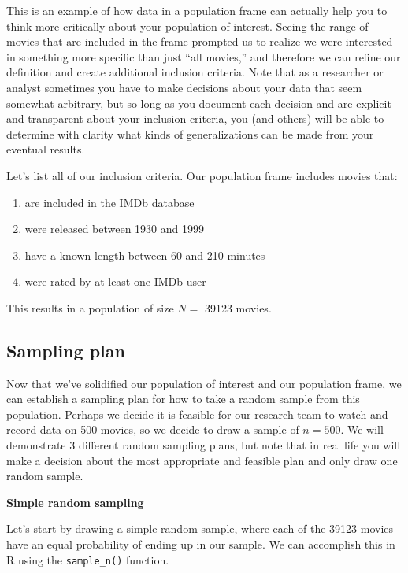 \documentclass[
  letterpaper,
  DIV=11,
  numbers=noendperiod]{scrreprt}
\providecommand{\tightlist}{%
  \setlength{\itemsep}{0pt}\setlength{\parskip}{0pt}}\usepackage{longtable,booktabs,array}
\theoremstyle{definition}
\theoremstyle{remark}
\begin{document}
This is an example of how data in a population frame can actually help
you to think more critically about your population of interest. Seeing
the range of movies that are included in the frame prompted us to
realize we were interested in something more specific than just ``all
movies,'' and therefore we can refine our definition and create
additional inclusion criteria. Note that as a researcher or analyst
sometimes you have to make decisions about your data that seem somewhat
arbitrary, but so long as you document each decision and are explicit
and transparent about your inclusion criteria, you (and others) will be
able to determine with clarity what kinds of generalizations can be made
from your eventual results.

Let's list all of our inclusion criteria. Our population frame includes
movies that:

\begin{enumerate}
\def\labelenumi{\arabic{enumi}.}
\tightlist
\item
  are included in the IMDb database
\item
  were released between 1930 and 1999
\item
  have a known length between 60 and 210 minutes
\item
  were rated by at least one IMDb user
\end{enumerate}

This results in a population of size \(N =\) 39123 movies.

\hypertarget{sampling-plan}{%
\subsection{Sampling plan}\label{sampling-plan}}

Now that we've solidified our population of interest and our population
frame, we can establish a sampling plan for how to take a random sample
from this population. Perhaps we decide it is feasible for our research
team to watch and record data on 500 movies, so we decide to draw a
sample of \(n = 500\). We will demonstrate 3 different random sampling
plans, but note that in real life you will make a decision about the
most appropriate and feasible plan and only draw one random sample.

\textbf{Simple random sampling}

Let's start by drawing a simple random sample, where each of the 39123
movies have an equal probability of ending up in our sample. We can
accomplish this in R using the \texttt{sample\_n()} function.
\end{document}
